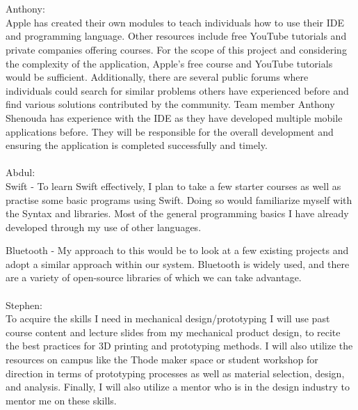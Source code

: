 \documentclass[12pt]{article}
\begin{document}
\begin{enumerate}
\\
\\
Anthony:
\\
Apple has created their own modules to teach individuals how to use their IDE and programming language. Other resources include free YouTube tutorials and private companies offering courses. For the scope of this project and considering the complexity of the application, Apple’s free course and YouTube tutorials would be sufficient. Additionally, there are several public forums where individuals could search for similar problems others have experienced before and find various solutions contributed by the community. Team member Anthony Shenouda has experience with the IDE as they have developed multiple mobile applications before. They will be responsible for the overall development and ensuring the application is completed successfully and timely. 
\\
\\
Abdul:
\\ 
 Swift -  To learn Swift effectively, I plan to take a few starter courses as well as practise some basic programs using Swift. Doing so would familiarize myself with the Syntax and libraries. Most of the general programming basics I have already developed through my use of other languages. 
  
 Bluetooth - My approach to this would be to look at a few existing projects and adopt a similar approach within our system. Bluetooth is widely used, and there are a variety of open-source libraries of which we can take advantage.
\\
\\
Stephen:
\\
 To acquire the skills I need in mechanical design/prototyping I will use past course content and lecture slides from my mechanical product design, to recite the best practices for 3D printing and prototyping methods. I will also utilize the resources on campus like the Thode maker space or student workshop for direction in terms of prototyping processes as well as material selection, design, and analysis.  Finally, I will also utilize a mentor who is in the design industry to mentor me on these skills.
\end{enumerate}
\end{document}
